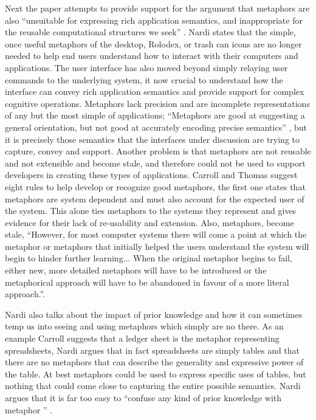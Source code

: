 \documentclass{sig-alternate}
\begin{document}
 
Next the paper attempts to provide support for the argument that metaphors are
also ``unsuitable for expressing rich application semantics, and inappropriate
for the reusable computational structures we seek'' \cite{Nardi:BeyondModels}.
Nardi states that the simple, once useful metaphors of the desktop, Rolodex, or
trash can icons are no longer needed to help end users understand how to
interact with their computers and applications. The user interface has also moved beyond
simply relaying user commands to the underlying system, it now crucial to
understand how the interface can convey rich application semantics and provide
support for complex cognitive operations. Metaphors lack precision and are
incomplete representations of any but the most simple of applications;
``Metaphors are good at suggesting a general orientation, but not good at
accurately encoding precise semantics'' \cite{Nardi:BeyondModels}, but it is
precisely those semantics that the interfaces under discussion are trying to
capture, convey and support. Another problem is that metaphors are not reusable
and not extensible and become stale, and therefore could not be used to support
developers in creating these types of applications. Carroll and Thomas
\cite{Carroll:MetaphorAndTheCognitiveRepresentation} suggest eight rules to help
develop or recognize good metaphors, the first one states that metaphors are
system dependent and must also account for the expected user of the system. This
alone ties metaphors to the systems they represent and gives evidence for their
lack of re-usability and extension. Also, metaphors, become stale, ``However,
for most computer systems there will come a point at which the metaphor or
metaphors that initially helped the users understand the system will begin to
hinder further learning... When the original metaphor begins to fail, either
new, more detailed metaphors will have to be introduced or the metaphorical
approach will have to be abandoned in favour of a more literal
approach.''\cite{Carroll:MetaphorAndTheCognitiveRepresentation}. 
 
 
Nardi also
talks about the impact of prior knowledge and how it can sometimes temp us into
seeing and using metaphors which simply are no there. As an example Carroll
\cite{Carroll:1988:InterfaceMetaphorsAndUserInterfaceDesign} suggests that a
ledger sheet is the metaphor representing spreadsheets, Nardi argues that in
fact spreadsheets are simply tables and that there are no metaphors that can
describe the generality and expressive power of the table. At best metaphors
could be used to express specific uses of tables, but nothing that could come
close to capturing the entire possible semantics. Nardi argues that it  is far
too easy to ``confuse any kind of prior knowledge with metaphor ''
\cite{Nardi:BeyondModels}. 
\end{document}
